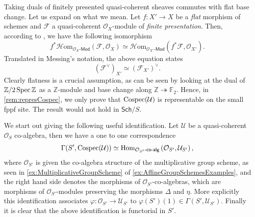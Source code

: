 \begin{rem}\label{rem:dualsAndBaseChange}
	Taking duals of finitely presented quasi-coherent sheaves
	commutes with flat base change.
	Let us expand on what we mean.
	Let \(f\colon X' \to X\) be a \emph{flat} morphism of schemes
	and \(\mathcal{F}\) a quasi-coherent \(\mathcal{O}_{ X }\)-module of
	\emph{finite presentation}.
	Then, according to 
	\cite[\href{https://stacks.math.columbia.edu/tag/0C6I}{Lemma 0C6I}]{SP},
	we have the following isomorphism
	\begin{equation*}
		f^* \mathcal{H}\mathrm{om}_{ \mathcal{O}_{ X }\text{-}\mathsf{Mod}}
	( \mathcal{F},  \mathcal{O}_{ X } ) \simeq
		\mathcal{H}\mathrm{om}_{ \mathcal{O}_{ X' }\text{-}\mathsf{Mod}}
	( f^*\mathcal{F},  \mathcal{O}_{ X' } )	
	.\end{equation*}
	Translated in Messing's notation, the above equation states
	\begin{equation*}
		(\mathcal{F}^\vee)_{ X' } \simeq (\mathcal{F}_{ X' })^\vee
	.\end{equation*}
	Clearly flatness is a crucial assumption, as can be seen
	by looking at the dual of \(\mathbb{Z}/2\operatorname{Spec} \mathbb{Z}\)
	as a \(\mathbb{Z}\)-module
	and base change along \(\mathbb{Z} \twoheadrightarrow \mathbb{F}_2\).
	Hence, in \cref{rem:represCospec}, 
	we only prove that \(\operatorname{Cospec}(\mathcal{U})\) is representable
	on the small fppf site.
	The result would not hold in \(\mathsf{Sch}/S\).
\end{rem}


\begin{rem}[]\label{rem:CospecSections}
	We start out giving the following useful identification.
	Let $\mathcal{U}$ be a quasi-coherent $\mathcal{O}_{ S }$ co-algebra,
	then we have a one to one correspondence
	\begin{equation*}
	\Gamma(S', \operatorname{Cospec}(\mathcal{U})) \simeq
	\operatorname{Hom}_{ \mathcal{O}_{ S' }\text{-}\mathsf{co}\text{-}\mathsf{alg}} 
	\left( \mathcal{O}_{ S' }, \mathcal{U}_{S'} \right)
	,\end{equation*}
	where $\mathcal{O}_{ S' }$ is given the co-algebra structure 
	of the multiplicative group scheme, as seen in
	\cref{ex:MultiplicativeGroupScheme} of \cref{ex:AffineGroupSchemesExamples},
	and the right hand side denotes the morphisms of 
	$\mathcal{O}_{ S' }$-co-algebras, which are
	morphisms of \(\mathcal{O}_{ S' }\)-modules
	preserving the morphisms $\Delta$ and \(\eta\).
	More explicitly this identification associates
	$\varphi\colon \mathcal{O}_{ S' } \to \mathcal{U}_{S'}$ to
	$\varphi(S')(1) \in \Gamma(S', \mathcal{U}_{S'})$.
	Finally it is clear that the above identification is functorial in $S'$.
\end{rem}


